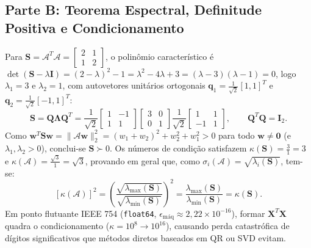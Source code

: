 \documentclass[11pt,a4paper]{article}
\begin{document}
\subsection{Parte B: Teorema Espectral, Definitude Positiva e Condicionamento}
Para $\mathbf{S} = \mathcal{A}^T\mathcal{A} = \begin{bmatrix} 2 & 1 \\ 1 & 2 \end{bmatrix}$, o polinômio característico é $\det(\mathbf{S} - \lambda\mathbf{I}) = (2-\lambda)^2 - 1 = \lambda^2 - 4\lambda + 3 = (\lambda - 3)(\lambda - 1) = 0$, logo $\lambda_1 = 3$ e $\lambda_2 = 1$, com autovetores unitários ortogonais $\mathbf{q}_1 = \frac{1}{\sqrt{2}}[1, 1]^T$ e $\mathbf{q}_2 = \frac{1}{\sqrt{2}}[-1, 1]^T$:
\[
\mathbf{S} = \mathbf{Q}\boldsymbol{\Lambda}\mathbf{Q}^T = \frac{1}{\sqrt{2}}\begin{bmatrix} 1 & -1 \\ 1 & 1 \end{bmatrix}\begin{bmatrix} 3 & 0 \\ 0 & 1 \end{bmatrix}\frac{1}{\sqrt{2}}\begin{bmatrix} 1 & 1 \\ -1 & 1 \end{bmatrix}, \qquad \mathbf{Q}^T\mathbf{Q} = \mathbf{I}_2.
\]
Como $\mathbf{w}^T\mathbf{S}\mathbf{w} = \|\mathcal{A}\mathbf{w}\|_2^2 = (w_1+w_2)^2 + w_2^2 + w_1^2 > 0$ para todo $\mathbf{w} \ne \mathbf{0}$ (e $\lambda_1, \lambda_2 > 0$), conclui-se $\mathbf{S} \succ 0$. Os números de condição satisfazem $\kappa(\mathbf{S}) = \frac{3}{1} = 3$ e $\kappa(\mathcal{A}) = \frac{\sqrt{3}}{1} = \sqrt{3}$, provando em geral que, como $\sigma_i(\mathcal{A}) = \sqrt{\lambda_i(\mathbf{S})}$, tem-se:
\[
[\kappa(\mathcal{A})]^2 = \left(\frac{\sqrt{\lambda_{\max}(\mathbf{S})}}{\sqrt{\lambda_{\min}(\mathbf{S})}}\right)^2 = \frac{\lambda_{\max}(\mathbf{S})}{\lambda_{\min}(\mathbf{S})} = \kappa(\mathbf{S}).
\]
Em ponto flutuante IEEE 754 (\texttt{float64}, $\epsilon_{\text{máq}} \approx 2{,}22\times 10^{-16}$), formar $\mathbf{X}^T\mathbf{X}$ quadra o condicionamento ($\kappa=10^8 \to 10^{16}$), causando perda catastrófica de dígitos significativos que métodos diretos baseados em QR ou SVD evitam.
\end{document}
